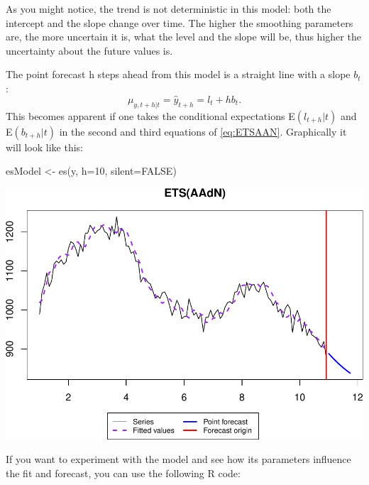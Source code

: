 \documentclass[
]{book}
\newenvironment{Shaded}{\begin{snugshade}}{\end{snugshade}}
\newcommand{\AttributeTok}[1]{\textcolor[rgb]{0.77,0.63,0.00}{#1}}
\newcommand{\ConstantTok}[1]{\textcolor[rgb]{0.00,0.00,0.00}{#1}}
\newcommand{\DecValTok}[1]{\textcolor[rgb]{0.00,0.00,0.81}{#1}}
\newcommand{\FloatTok}[1]{\textcolor[rgb]{0.00,0.00,0.81}{#1}}
\newcommand{\FunctionTok}[1]{\textcolor[rgb]{0.00,0.00,0.00}{#1}}
\newcommand{\NormalTok}[1]{#1}
\newcommand{\OtherTok}[1]{\textcolor[rgb]{0.56,0.35,0.01}{#1}}
\newcommand{\SpecialCharTok}[1]{\textcolor[rgb]{0.00,0.00,0.00}{#1}}
\theoremstyle{definition}
\theoremstyle{definition}
\theoremstyle{definition}
\theoremstyle{definition}
\theoremstyle{remark}
\begin{document}
As you might notice, the trend is not deterministic in this model: both the intercept and the slope change over time. The higher the smoothing parameters are, the more uncertain it is, what the level and the slope will be, thus higher the uncertainty about the future values is.

The point forecast h steps ahead from this model is a straight line with a slope \(b_t\):
\begin{equation}
    \mu_{y,t+h|t} = \hat{y}_{t+h} = l_{t} + h b_t.
  \label{eq:ETSAANForecast}
\end{equation}
This becomes apparent if one takes the conditional expectations E\((l_{t+h}|t)\) and E\((b_{t+h}|t)\) in the second and third equations of \eqref{eq:ETSAAN}. Graphically it will look like this:

\begin{Shaded}
\begin{Highlighting}[]
\NormalTok{esModel }\OtherTok{\textless{}{-}} \FunctionTok{es}\NormalTok{(y, }\AttributeTok{h=}\DecValTok{10}\NormalTok{, }\AttributeTok{silent=}\ConstantTok{FALSE}\NormalTok{)}
\end{Highlighting}
\end{Shaded}

\includegraphics{adam_files/figure-latex/unnamed-chunk-25-1.pdf}

If you want to experiment with the model and see how its parameters influence the fit and forecast, you can use the following R code:

\begin{Shaded}
\end{Shaded}
\end{document}
